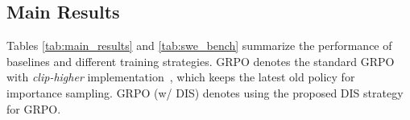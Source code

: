 

\subsection{Main Results}
Tables \ref{tab:main_results} and \ref{tab:swe_bench} summarize the performance of baselines and different training strategies. GRPO denotes the standard GRPO with \textit{clip-higher} implementation~\cite{yue2025vapo}, which keeps the latest old policy for importance sampling. GRPO (w/ DIS) denotes using the proposed DIS strategy for GRPO.


